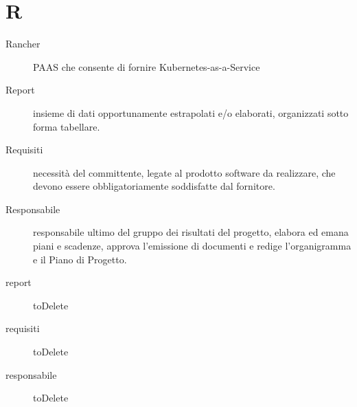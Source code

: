 \documentclass{article}
\begin{document}
  \section{R}
  \begin{description}
    \item[Rancher] PAAS che consente di fornire Kubernetes-as-a-Service
    \item[Report] insieme di dati opportunamente estrapolati e/o elaborati, organizzati sotto forma tabellare.
    \item[Requisiti] necessità del committente, legate al prodotto software da realizzare, che devono essere obbligatoriamente soddisfatte dal fornitore.
    \item[Responsabile] responsabile ultimo del gruppo dei risultati del progetto, elabora ed emana piani e scadenze, approva l'emissione di documenti e redige l'organigramma e il Piano di Progetto.
    \item[report] toDelete
    \item[requisiti] toDelete
    \item[responsabile] toDelete
	\end{description}
\end{document}
